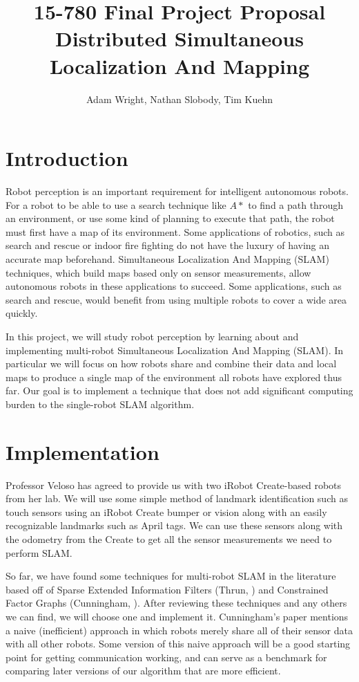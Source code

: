 \documentclass[11pt]{article}
\title{
15-780 Final Project Proposal \\ 
Distributed Simultaneous Localization And Mapping \\
}
\author{Adam Wright, Nathan Slobody, Tim Kuehn}
\begin{document}
\maketitle

\section{Introduction}

Robot perception is an important requirement for intelligent autonomous robots. For a robot to be able to use a search technique like $A*$ to find a path through an environment, or use some kind of planning to execute that path, the robot must first have a map of its environment. Some applications of robotics, such as search and rescue or indoor fire fighting do not have the luxury of having an accurate map beforehand. Simultaneous Localization And Mapping (SLAM) techniques, which build maps based only on sensor measurements, allow autonomous robots in these applications to succeed. Some applications, such as search and rescue, would benefit from using multiple robots to cover a wide area quickly. 

In this project, we will study robot perception by learning about and implementing multi-robot Simultaneous Localization And Mapping (SLAM). In particular we will focus on how robots share and combine their data and local maps to produce a single map of the environment all robots have explored thus far. Our goal is to implement a technique that does not add significant computing burden to the single-robot SLAM algorithm.

\section{Implementation}

Professor Veloso has agreed to provide us with two iRobot Create-based robots from her lab. We will use some simple method of landmark identification such as touch sensors using an iRobot Create bumper or vision along with an easily recognizable landmarks such as April tags. We can use these sensors along with the odometry from the Create to get all the sensor measurements we need to perform SLAM.

So far, we have found some techniques for multi-robot SLAM in the literature based off of Sparse Extended Information Filters (Thrun, \cite{thrun2003}) and Constrained Factor Graphs (Cunningham, \cite{cunningham2010}). After reviewing these techniques and any others we can find, we will choose one and implement it. Cunningham's paper mentions a naive (inefficient) approach in which robots merely share all of their sensor data with all other robots. Some version of this naive approach will be a good starting point for getting communication working, and can serve as a benchmark for comparing later versions of our algorithm that are more efficient.
\end{document}
